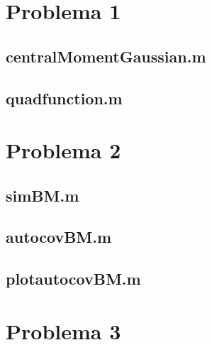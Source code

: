 \documentclass[a4paper,11pt]{article}
\begin{document}
\pagebreak
\appendix
  \section{Problema 1}
    \subsection{centralMomentGaussian.m}

    
    \subsection{quadfunction.m}
    

  \pagebreak
  \section{Problema 2}
    \subsection{simBM.m}
    
    \subsection{autocovBM.m}
    
    \subsection{plotautocovBM.m}
    

  \pagebreak
  \section{Problema 3}
\end{document}
